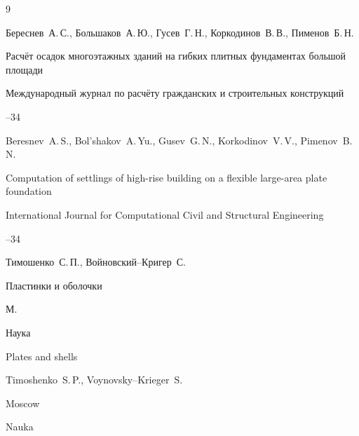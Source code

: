 \begin{thebibliography}{9}




\by Береснев~А.\,С., Большаков~А.\,Ю., Гусев~Г.\,Н., Коркодинов~В.\,В., Пименов~Б.\,Н.

\paper Расчёт осадок многоэтажных зданий на гибких плитных фундаментах большой площади

\jour Международный журнал по расчёту гражданских и строительных конструкций




--34


\misctransl

\by Beresnev~A.\,S., Bol'shakov~A.\,Yu., Gusev~G.\,N., Korkodinov~V.\,V., Pimenov~B.\,N.

\paper Computation of settlings of high-rise building on a flexible large-area plate foundation

\jour International Journal for Computational Civil and Structural Engineering




--34








\by Тимошенко~С.\,П., Войновский--Кригер~С.

\book Пластинки и оболочки

\publaddr М.


\publ Наука



\misctransl

\book Plates and shells 

\by Timoshenko~S.\,P., Voynovsky–Krieger~S.

\publaddr Moscow


\publ Nauka






\end{thebibliography}
